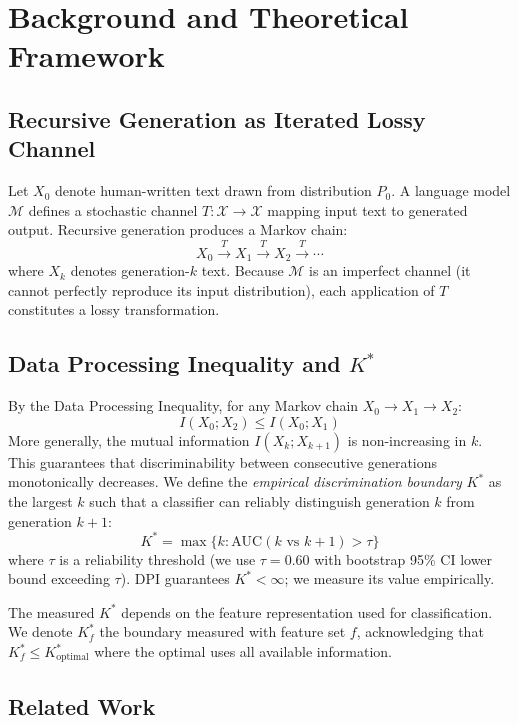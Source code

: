 \documentclass[11pt]{article}
\begin{document}
\section{Background and Theoretical Framework}
\label{sec:background}

\subsection{Recursive Generation as Iterated Lossy Channel}

Let $X_0$ denote human-written text drawn from distribution $P_0$. A language model $\mathcal{M}$ defines a stochastic channel $T: \mathcal{X} \to \mathcal{X}$ mapping input text to generated output. Recursive generation produces a Markov chain:
\[
X_0 \xrightarrow{T} X_1 \xrightarrow{T} X_2 \xrightarrow{T} \cdots
\]
where $X_k$ denotes generation-$k$ text. Because $\mathcal{M}$ is an imperfect channel (it cannot perfectly reproduce its input distribution), each application of $T$ constitutes a lossy transformation.

\subsection{Data Processing Inequality and $K^*$}

By the Data Processing Inequality, for any Markov chain $X_0 \to X_1 \to X_2$:
\[
I(X_0; X_2) \leq I(X_0; X_1)
\]
More generally, the mutual information $I(X_k; X_{k+1})$ is non-increasing in $k$. This guarantees that discriminability between consecutive generations monotonically decreases. We define the \emph{empirical discrimination boundary} $K^*$ as the largest $k$ such that a classifier can reliably distinguish generation $k$ from generation $k{+}1$:
\[
K^* = \max\{k : \text{AUC}(k \text{ vs } k{+}1) > \tau\}
\]
where $\tau$ is a reliability threshold (we use $\tau = 0.60$ with bootstrap 95\% CI lower bound exceeding $\tau$). DPI guarantees $K^* < \infty$; we measure its value empirically.

The measured $K^*$ depends on the feature representation used for classification. We denote $K^*_f$ the boundary measured with feature set $f$, acknowledging that $K^*_f \leq K^*_{\text{optimal}}$ where the optimal uses all available information.

\subsection{Related Work}
\end{document}
